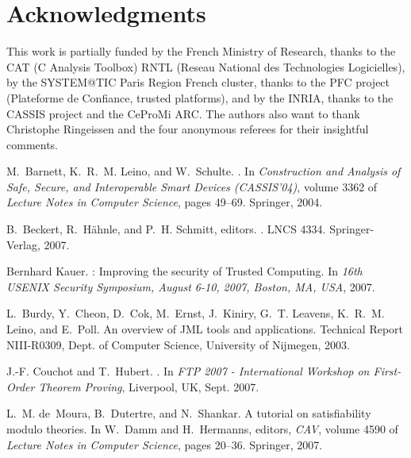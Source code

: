 \documentclass{acm_proc_article-sp}
\theoremstyle{nonumberplain}
\begin{document}
\section{Acknowledgments}
This work is partially funded by the French Ministry of Research,
thanks to the CAT (C Analysis Toolbox) RNTL (Reseau National des
Technologies Logicielles), by the SYSTEM@TIC Paris Region French
cluster, thanks to the PFC project (Plateforme de Confiance, trusted
platforms), and by the INRIA, thanks to the CASSIS project and the
CeProMi ARC. The authors also want to thank Christophe Ringeissen and
the four anonymous referees for their insightful comments.







\begin{thebibliography}{10}

M.~Barnett, K.~R.~M. Leino, and W.~Schulte.
.
\newblock In {\em Construction and Analysis of Safe, Secure, and Interoperable
  Smart Devices (CASSIS'04)}, volume 3362 of {\em Lecture Notes in Computer
  Science}, pages 49--69. Springer, 2004.

B.~Beckert, R.~H\"ahnle, and P.~H. Schmitt, editors.
.
\newblock LNCS 4334. Springer-Verlag, 2007.

{B}ernhard {K}auer.
: {I}mproving the security of {T}rusted {C}omputing.
\newblock In {\em 16th {USENIX} {S}ecurity {S}ymposium, {A}ugust 6-10, 2007,
  {B}oston, {MA}, {USA}}, 2007.

L.~Burdy, Y.~Cheon, D.~Cok, M.~Ernst, J.~Kiniry, G.~T. Leavens, K.~R.~M. Leino,
  and E.~Poll.
\newblock An overview of {JML} tools and applications.
\newblock Technical Report NIII-R0309, Dept. of Computer Science, University of
  Nijmegen, 2003.

J.-F. Couchot and T.~Hubert.
.
\newblock In {\em FTP 2007 - International Workshop on First-Order Theorem
  Proving}, Liverpool, UK, Sept. 2007.

L.~M. de~Moura, B.~Dutertre, and N.~Shankar.
\newblock A tutorial on satisfiability modulo theories.
\newblock In W.~Damm and H.~Hermanns, editors, {\em CAV}, volume 4590 of {\em
  Lecture Notes in Computer Science}, pages 20--36. Springer, 2007.


\end{thebibliography}
\end{document}
